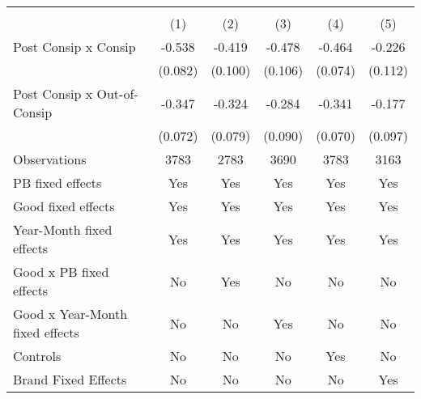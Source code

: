 \begin{tabular}{l*{5}{c}}
\hline\hline
                    &\multicolumn{5}{c}{ }                                           \\
                    &\multicolumn{1}{c}{(1)}&\multicolumn{1}{c}{(2)}&\multicolumn{1}{c}{(3)}&\multicolumn{1}{c}{(4)}&\multicolumn{1}{c}{(5)}\\
\hline
Post Consip x Consip&      -0.538&      -0.419&      -0.478&      -0.464&      -0.226\\
                    &     (0.082)&     (0.100)&     (0.106)&     (0.074)&     (0.112)\\
[1em]
Post Consip x Out-of-Consip&      -0.347&      -0.324&      -0.284&      -0.341&      -0.177\\
                    &     (0.072)&     (0.079)&     (0.090)&     (0.070)&     (0.097)\\
\hline
Observations        &        3783&        2783&        3690&        3783&        3163\\
PB fixed effects    &         Yes&         Yes&         Yes&         Yes&         Yes\\
Good fixed effects  &         Yes&         Yes&         Yes&         Yes&         Yes\\
Year-Month fixed effects&         Yes&         Yes&         Yes&         Yes&         Yes\\
Good x PB fixed effects&          No&         Yes&          No&          No&          No\\
Good x Year-Month fixed effects&          No&          No&         Yes&          No&          No\\
Controls            &          No&          No&          No&         Yes&          No\\
Brand Fixed Effects &          No&          No&          No&          No&         Yes\\
\hline\hline
\end{tabular}
